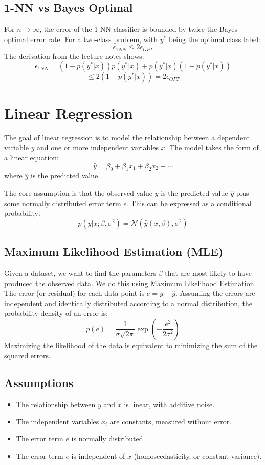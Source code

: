 \documentclass{article}
\begin{document}
\begin{multicols}{2}
\subsection{1-NN vs Bayes Optimal}
For $n \rightarrow \infty$, the error of the 1-NN classifier is bounded by twice the Bayes optimal error rate. 
For a two-class problem, with $y^*$ being the optimal class label:
$$ \epsilon_{1NN} \le 2\epsilon_{OPT} $$
The derivation from the lecture notes shows:
$$ \epsilon_{1NN} = (1-p(y^*|x))p(y^*|x) + p(y^*|x)(1-p(y^*|x)) $$
$$\le 2(1-p(y^*|x)) = 2\epsilon_{OPT} $$ 


\section{Linear Regression}

The goal of linear regression is to model the relationship between a dependent variable $y$ and one or more independent variables $x$.
The model takes the form of a linear equation:
$$ \hat{y} = \beta_0 + \beta_1 x_1 + \beta_2 x_2 + \cdots $$
where $\hat{y}$ is the predicted value.

The core assumption is that the observed value $y$ is the predicted value $\hat{y}$ plus some normally distributed error term $\epsilon$. This can be expressed as a conditional probability:
$$ p(y|x; \beta, \sigma^2) = \mathcal{N}(\hat{y}(x, \beta), \sigma^2) $$

\subsection{Maximum Likelihood Estimation (MLE)}
Given a dataset, we want to find the parameters $\beta$ that are most likely to have produced the observed data. We do this using Maximum Likelihood Estimation. The error (or residual) for each data point is $e = y - \hat{y}$. Assuming the errors are independent and identically distributed according to a normal distribution, the probability density of an error is:
$$ p(e) = \frac{1}{\sigma\sqrt{2\pi}} \exp\left(-\frac{e^2}{2\sigma^2}\right) $$
Maximizing the likelihood of the data is equivalent to minimizing the sum of the squared errors.

\subsection{Assumptions}
\begin{itemize}
    \item The relationship between $y$ and $x$ is linear, with additive noise.
    \item The independent variables $x_i$ are constants, measured without error.
    \item The error term $e$ is normally distributed.
    \item The error term $e$ is independent of $x$ (homoscedasticity, or constant variance).
\end{itemize}


\end{multicols}
\end{document}
